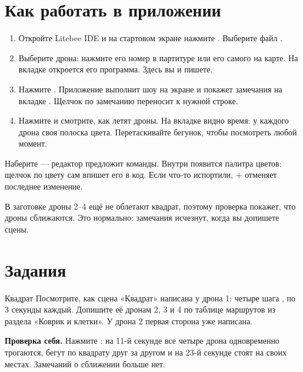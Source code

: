 \documentclass[a4paper,11pt]{scrartcl}
\begin{document}
\section{Как работать в приложении}

\begin{enumerate}
  \item Откройте Litebee IDE и на стартовом экране нажмите . Выберите файл .
  \item Выберите дрона: нажмите его номер в партитуре или его самого на карте. На вкладке  откроется его программа. Здесь вы и пишете.
  \item Нажмите . Приложение выполнит шоу на экране и покажет замечания на вкладке . Щелчок по замечанию переносит к нужной строке.
  \item Нажмите  и смотрите, как летят дроны. На вкладке  видно время: у каждого дрона своя полоска цвета. Перетаскивайте бегунок, чтобы посмотреть любой момент.
\end{enumerate}

\begin{zametka}
Наберите  — редактор предложит команды. Внутри  появится палитра цветов: щелчок по цвету сам впишет его в код. Если что-то испортили, + отменяет последнее изменение.
\end{zametka}

\begin{vnimanie}
В заготовке дроны 2--4 ещё не облетают квадрат, поэтому проверка покажет, что дроны сближаются. Это нормально: замечания исчезнут, когда вы допишете сцены.
\end{vnimanie}

\section{Задания}

\begin{zadanie}{Квадрат}
Посмотрите, как сцена «Квадрат» написана у дрона 1: четыре шага , по 3 секунды каждый. Допишите её дронам 2, 3 и 4 по таблице маршрутов из раздела «Коврик и клетки». У дрона 2 первая сторона уже написана.

\textbf{Проверка себя.} Нажмите : на 11-й секунде все четыре дрона одновременно трогаются, бегут по квадрату друг за другом и на 23-й секунде стоят на своих местах. Замечаний о сближении больше нет.
\end{zadanie}
\end{document}
